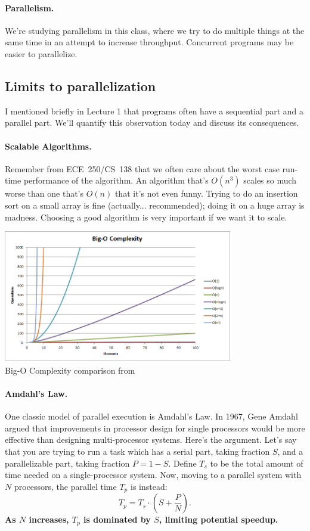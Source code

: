 \documentclass[a4paper]{report}
\begin{document}
\paragraph{Parallelism.} We're studying parallelism in this class, where
we try to do multiple things at the same time in an attempt to increase
throughput. Concurrent programs may be easier to parallelize.

\subsection*{Limits to parallelization}
I mentioned briefly in Lecture 1 that programs often have a sequential
part and a parallel part. We'll quantify this observation today
and discuss its consequences.

\paragraph{Scalable Algorithms.} 
Remember from ECE~250/CS~138 that we often care about the worst case run-time performance of the algorithm. An algorithm that's $O(n^{3})$ scales so much worse than one that's $O(n)$ that it's not even funny. Trying to do an insertion sort on a small array is fine (actually... recommended); doing it on a huge array is madness. Choosing a good algorithm is very important if we want it to scale. 

\begin{center}
	\includegraphics[width=0.75\textwidth]{images/big-o-complexity}\\
	Big-O Complexity comparison from ~\cite{bigocheatsheet}
\end{center}


\paragraph{Amdahl's Law.} One classic model of parallel execution
is Amdahl's Law. In 1967, Gene Amdahl argued that improvements in
processor design for single processors would be more effective than
designing multi-processor systems. Here's the argument. Let's say that
you are trying to run a task which has a serial part, taking fraction 
$S$, and a parallelizable part, taking fraction $P = 1-S$. Define $T_s$
to be the total 
amount of time needed on a single-processor system.
Now, moving to a parallel system with $N$ processors, the parallel
time $T_p$ is instead:
\[ T_p = T_s \cdot (S + \frac{P}{N}). \]
{\bf As $N$ increases, $T_p$ is dominated by $S$, limiting potential
speedup.}
\end{document}
